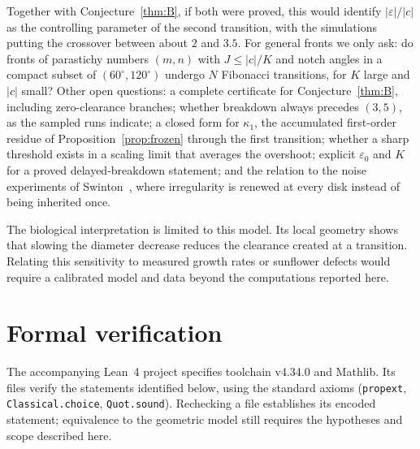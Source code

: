 \documentclass[11pt]{amsart}
\theoremstyle{definition}
\newcommand{\eps}{\varepsilon}
\begin{document}
\noindent Together with Conjecture~\ref{thm:B}, if both were proved, this would identify $|\eps|/|c|$ as the controlling parameter of the
second transition, with the simulations putting the crossover between about $2$ and $3.5$. For general
fronts we only ask: do fronts of parastichy numbers $(m,n)$ with $J\le |c|/K$ and notch angles
in a compact subset of $(60^\circ,120^\circ)$ undergo $N$ Fibonacci transitions, for $K$ large and $|c|$
small? Other open questions: a complete certificate for Conjecture~\ref{thm:B}, including zero-clearance branches;
whether breakdown always precedes $(3,5)$, as the sampled runs indicate; a closed form for
$\kappa_1$, the accumulated first-order residue of Proposition~\ref{prop:frozen} through the first
transition; whether a sharp threshold exists in a scaling limit that averages the overshoot; explicit
$\eps_0$ and $K$ for a proved delayed-breakdown statement; and the relation to the noise experiments of
Swinton~\cite{Swinton2024}, where irregularity is renewed at every disk instead of being inherited once.

The biological interpretation is limited to this model. Its local geometry shows that slowing
the diameter decrease reduces the clearance created at a transition. Relating this sensitivity
to measured growth rates or sunflower defects would require a calibrated model and data beyond
the computations reported here.

\appendix
\section{Formal verification}\label{app:lean}

The accompanying Lean~4 project specifies toolchain v4.34.0 and Mathlib. Its files verify the
statements identified below, using the standard axioms
(\texttt{propext}, \texttt{Classical.choice}, \texttt{Quot.sound}). Rechecking a file establishes its encoded statement; equivalence
to the geometric model still requires the hypotheses and scope described here.
\end{document}
